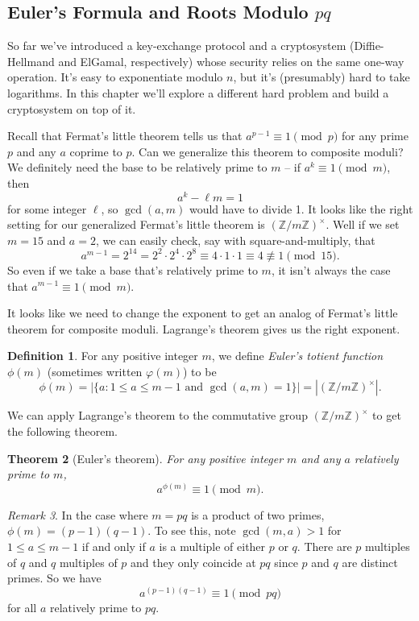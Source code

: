 \documentclass[12pt]{article}
\theoremstyle{plain}
\newtheorem{theorem}{Theorem}[section]
\theoremstyle{definition}
\newtheorem{definition}[theorem]{Definition}
\theoremstyle{remark}
\newtheorem{remark}[theorem]{Remark}
\newcommand{\Z}{\mathbb{Z}}
\begin{document}
\subsection{Euler's Formula and Roots Modulo $pq$}
So far we've introduced a key-exchange protocol and a cryptosystem (Diffie-Hellmand and ElGamal, respectively) whose security relies on the same one-way operation.
It's easy to exponentiate modulo $n$, but it's (presumably) hard to take logarithms.
In this chapter we'll explore a different hard problem and build a cryptosystem on top of it.

Recall that Fermat's little theorem tells us that $a^{p-1}\equiv 1\pmod p$ for any prime $p$ and any $a$ coprime to $p$.
Can we generalize this theorem to composite moduli?
We definitely need the base to be relatively prime to $m$ -- if $a^k \equiv 1\pmod m$, then
\[
    a^k - \ell m = 1
\]
for some integer $\ell$, so $\gcd(a, m)$ would have to divide 1.
It looks like the right setting for our generalized Fermat's little theorem is $(\Z/m\Z)^\times$.
Well if we set $m = 15$ and $a = 2$, we can easily check, say with square-and-multiply, that
\[
    a^{m-1} = 2^{14} = 2^2\cdot 2^4\cdot 2^8 \equiv 4\cdot 1\cdot 1 \equiv 4\not\equiv 1\pmod{15}.
\]
So even if we take a base that's relatively prime to $m$, it isn't always the case that $a^{m-1}\equiv 1\pmod m$.

It looks like we need to change the exponent to get an analog of Fermat's little theorem for composite moduli.
Lagrange's theorem gives us the right exponent.

\begin{definition}
    For any positive integer $m$, we define \emph{Euler's totient function} $\phi(m)$ (sometimes written $\varphi(m)$) to be
    \[
        \phi(m) = |\{a: 1\leq a \leq m-1\text{ and } \gcd(a,m) = 1\}| = |(\Z/m\Z)^\times|.
    \]
\end{definition}
We can apply Lagrange's theorem to the commutative group $(\Z/m\Z)^\times$ to get the following theorem.
\begin{theorem}[Euler's theorem]
    For any positive integer $m$ and any $a$ relatively prime to $m$,
    \[
        a^{\phi(m)} \equiv 1\pmod m.
    \]
\end{theorem}

\begin{remark}
    In the case where $m = pq$ is a product of two primes, $\phi(m) = (p-1)(q-1)$.
    To see this, note $\gcd(m,a) > 1$ for $1\leq a \leq m-1$ if and only if $a$ is a multiple of either $p$ or $q$.
    There are $p$ multiples of $q$ and $q$ multiples of $p$ and they only coincide at $pq$ since $p$ and $q$ are distinct primes.
    So we have
    \[
        a^{(p-1)(q-1)} \equiv 1\pmod {pq}
    \]
    for all $a$ relatively prime to $pq$.
\end{remark}
\end{document}

